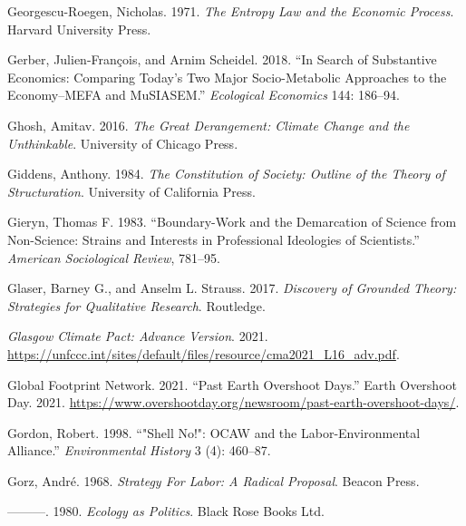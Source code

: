 \documentclass[a4paper, nobind]{templates/ociamthesis}
\newlength{\cslhangindent}
\newenvironment{CSLReferences}[2] %
 {%
  \setlength{\parindent}{0pt}
  \ifodd #1
  \let\oldpar\par
  \def\par{\hangindent=\cslhangindent\oldpar}
  \fi
  \setlength{\parskip}{1mm}
  \setlength{\baselineskip}{6mm}
 }%
 {}
\begin{document}
\begin{CSLReferences}{1}{0}
\leavevmode{}%
Georgescu-Roegen, Nicholas. 1971. \emph{The {Entropy Law} and the {Economic Process}}. {Harvard University Press}.

\leavevmode{}%
Gerber, Julien-François, and Arnim Scheidel. 2018. {``In Search of Substantive Economics: Comparing Today's Two Major Socio-Metabolic Approaches to the Economy--{MEFA} and {MuSIASEM}.''} \emph{Ecological Economics} 144: 186--94.

\leavevmode{}%
Ghosh, Amitav. 2016. \emph{The {Great Derangement}: {Climate Change} and the {Unthinkable}}. {University of Chicago Press}.

\leavevmode{}%
Giddens, Anthony. 1984. \emph{The {Constitution} of {Society}: {Outline} of the {Theory} of {Structuration}}. {University of California Press}.

\leavevmode{}%
Gieryn, Thomas F. 1983. {``Boundary-Work and the Demarcation of Science from Non-Science: {Strains} and Interests in Professional Ideologies of Scientists.''} \emph{American Sociological Review}, 781--95.

\leavevmode{}%
Glaser, Barney G., and Anselm L. Strauss. 2017. \emph{Discovery of {Grounded Theory}: {Strategies} for {Qualitative Research}}. {Routledge}.

\leavevmode{}%
\emph{Glasgow {Climate Pact}: {Advance Version}}. 2021. \url{https://unfccc.int/sites/default/files/resource/cma2021_L16_adv.pdf}.

\leavevmode{}%
Global Footprint Network. 2021. {``Past {Earth Overshoot Days}.''} {Earth Overshoot Day}. 2021. \url{https://www.overshootday.org/newsroom/past-earth-overshoot-days/}.

\leavevmode{}%
Gordon, Robert. 1998. {``"{Shell No}!": {OCAW} and the {Labor-Environmental Alliance}.''} \emph{Environmental History} 3 (4): 460--87.

\leavevmode{}%
Gorz, André. 1968. \emph{Strategy {For Labor}: {A Radical Proposal}}. {Beacon Press}.

\leavevmode{}%
---------. 1980. \emph{Ecology as {Politics}}. {Black Rose Books Ltd.}


\end{CSLReferences}
\end{document}
